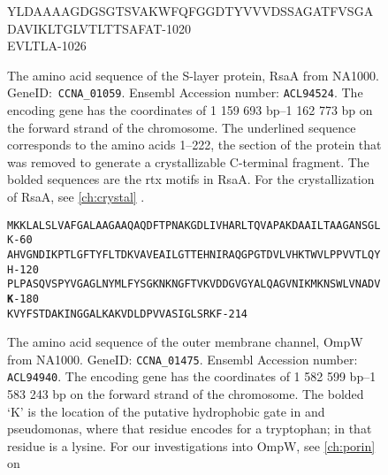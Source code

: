 \begin{figure}[htb]
\begin{center}
{YLDAAAAGDGSGTSVAKWFQFGGDTYVVVDSSAGATFVSGADAVIKLTGLVTLTTSAFAT\hfill-1020\\
EVLTLA\hfill-1026\\
  }
   	\end{center}
   	\caption[RsaA, amino acid sequence]{
   The amino acid sequence of the \ac{S-layer} protein, RsaA from \caulobacter{} NA1000. GeneID:~\texttt{CCNA\_01059}. Ensembl Accession number: \texttt{ACL94524}. The encoding gene has the coordinates of 1 159 693 bp--1 162 773 bp on the forward strand of the \caulobacter chromosome. The underlined sequence corresponds to the amino acids 1--222, the section of the protein that was removed to generate a crystallizable C-terminal fragment. The bolded sequences are the \ac{rtx} motifs in RsaA. For the crystallization of RsaA, see \cref{ch:crystal} .}
   	
\end{figure}   
\begin{figure}[htb]
  	\begin{center}
\label{app:ompwseq}
\texttt{\singlespacing\small  MKKLALSLVAFGALAAGAAQAQDFTPNAKGDLIVHARLTQVAPAKDAAILTAAGANSGLK\hfill-60~\\
AHVGNDIKPTLGFTYFLTDKVAVEAILGTTEHNIRAQGPGTDVLVHKTWVLPPVVTLQYH\hfill-120\\
PLPASQVSPYVGAGLNYMLFYSGKNKNGFTVKVDDGVGYALQAGVNIKMKNSWLVNADV\textbf{K}\hfill-180\\
KVYFSTDAKINGGALKAKVDLDPVVASIGLSRKF\hfill-214\\
  }
   	\end{center}
   	\caption[OmpW, amino acid sequence]{
   The amino acid sequence of the outer membrane channel, OmpW from \caulobacter NA1000. GeneID: \texttt{CCNA\_01475}. Ensembl Accession number: \texttt{ACL94940}. The encoding gene has the coordinates of 1 582 599 bp--1 583 243 bp on the forward strand of the \caulobacter chromosome. The bolded `K' is the location of the putative hydrophobic gate in \ecoli and \ac{pseudomonas}, where that residue encodes for a tryptophan; in \caulobacter that residue is a lysine. For our investigations into OmpW, see \cref{ch:porin} on }
\end{figure}   
